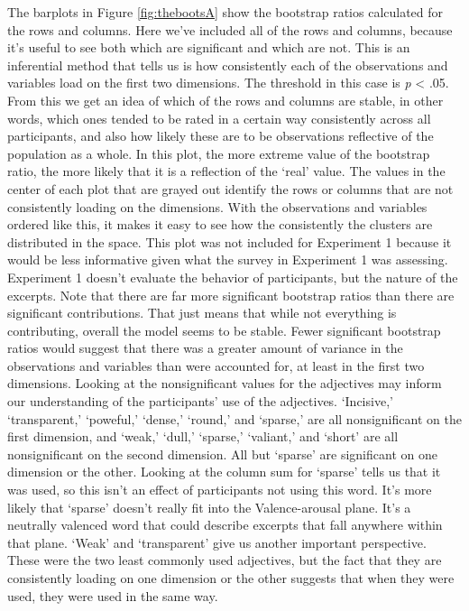 \documentclass[
  english,
  man,floatsintext]{apa6}
\begin{document}
The barplots in Figure \ref{fig:thebootsA} show the bootstrap ratios calculated for the rows and columns. Here we've included all of the rows and columns, because it's useful to see both which are significant and which are not. This is an inferential method that tells us is how consistently each of the observations and variables load on the first two dimensions. The threshold in this case is \emph{p} \textless{} .05. From this we get an idea of which of the rows and columns are stable, in other words, which ones tended to be rated in a certain way consistently across all participants, and also how likely these are to be observations reflective of the population as a whole. In this plot, the more extreme value of the bootstrap ratio, the more likely that it is a reflection of the `real' value. The values in the center of each plot that are grayed out identify the rows or columns that are not consistently loading on the dimensions. With the observations and variables ordered like this, it makes it easy to see how the consistently the clusters are distributed in the space. This plot was not included for Experiment 1 because it would be less informative given what the survey in Experiment 1 was assessing. Experiment 1 doesn't evaluate the behavior of participants, but the nature of the excerpts.
Note that there are far more significant bootstrap ratios than there are significant contributions. That just means that while not everything is contributing, overall the model seems to be stable. Fewer significant bootstrap ratios would suggest that there was a greater amount of variance in the observations and variables than were accounted for, at least in the first two dimensions. Looking at the nonsignificant values for the adjectives may inform our understanding of the participants' use of the adjectives. `Incisive,' `transparent,' `poweful,' `dense,' `round,' and `sparse,' are all nonsignificant on the first dimension, and `weak,' `dull,' `sparse,' `valiant,' and `short' are all nonsignificant on the second dimension. All but `sparse' are significant on one dimension or the other. Looking at the column sum for `sparse' tells us that it was used, so this isn't an effect of participants not using this word. It's more likely that `sparse' doesn't really fit into the Valence-arousal plane. It's a neutrally valenced word that could describe excerpts that fall anywhere within that plane. `Weak' and `transparent' give us another important perspective. These were the two least commonly used adjectives, but the fact that they are consistently loading on one dimension or the other suggests that when they were used, they were used in the same way.
\end{document}
